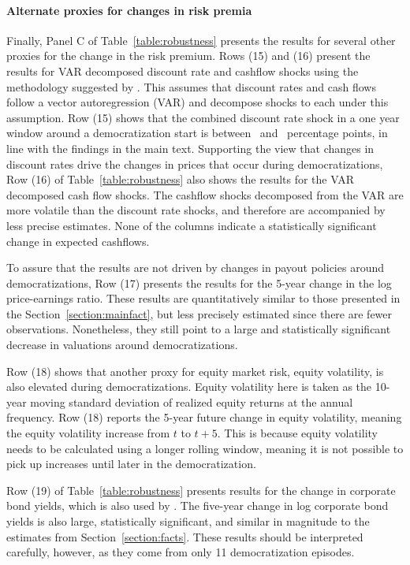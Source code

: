 \paragraph{Alternate proxies for changes in risk premia}
Finally, Panel C of Table~\ref{table:robustness} presents the results for several other proxies for the change in the risk premium. Rows (15) and (16) present the results for VAR decomposed discount rate and cashflow shocks using the methodology suggested by \citep{Campbell1991}.  This assumes that discount rates and cash flows follow a vector autoregression (VAR) and decompose shocks to each under this assumption. Row (15) shows that the combined discount rate shock in a one year window around a democratization start is between \tabBThreeDRLow\ and \tabBThreeDRHigh\ percentage points, in line with the findings in the main text. Supporting the view that changes in discount rates drive the changes in prices that occur during democratizations, Row (16) of Table~\ref{table:robustness} also shows the results for the VAR decomposed cash flow shocks. The cashflow shocks decomposed from the VAR are more volatile than the discount rate shocks, and therefore are accompanied by less precise estimates. None of the columns indicate a statistically significant change in expected cashflows. 

To assure that the results are not driven by changes in payout policies around democratizations, Row (17) presents the results for the 5-year change in the log price-earnings ratio. These results are quantitatively similar to those presented in the Section~\ref{section:mainfact}, but less precisely estimated since there are fewer observations. Nonetheless, they still point to a large and statistically significant decrease in valuations around democratizations.

Row (18) shows that another proxy for equity market risk, equity volatility, is also elevated during democratizations. Equity volatility here is taken as the 10-year moving standard deviation of realized equity returns at the annual frequency. Row (18) reports the 5-year future change in equity volatility, meaning the equity volatility increase from $t$ to $t+5$. This is because equity volatility needs to be calculated using a longer rolling window, meaning it is not possible to pick up increases until later in the democratization.

Row (19) of Table~\ref{table:robustness} presents results for the change in corporate bond yields, which is also used by \cite{Muir2017}. The five-year change in log corporate bond yields is also large, statistically significant, and similar in magnitude to the estimates from Section~\ref{section:facts}. These results should be interpreted carefully, however, as they come from only 11 democratization episodes.

